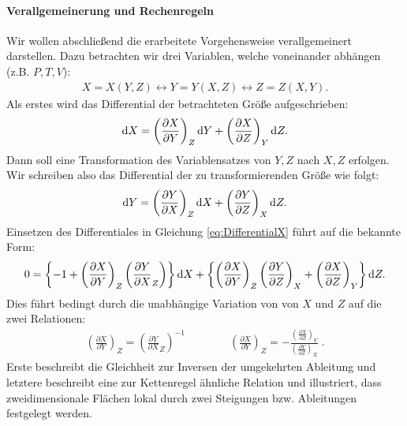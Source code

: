 \paragraph*{Verallgemeinerung und Rechenregeln}
Wir wollen abschließend die erarbeitete Vorgehensweise verallgemeinert darstellen. Dazu betrachten wir drei Variablen, welche voneinander abhängen (z.B. $P,T,V$):
\begin{align*}
	X=X(Y,Z) \leftrightarrow Y=Y(X,Z) \leftrightarrow Z=Z(X,Y).
\end{align*}
Als erstes wird das Differential der betrachteten Größe aufgeschrieben:
\begin{align}
	\label{eq:DifferentialX}
	\mathop{}\!\mathrm{d} X = \left(\frac{\partial X}{\partial Y}\right)_Z\mathop{}\!\mathrm{d} Y+\left(\frac{\partial X}{\partial Z}\right)_Y\mathop{}\!\mathrm{d} Z.
\end{align}
Dann soll eine Transformation des Variablensatzes von $Y,Z$ nach $X,Z$ erfolgen. Wir schreiben also das Differential der zu transformierenden Größe wie folgt:
\begin{align*}
	\mathop{}\!\mathrm{d} Y=\left(\frac{\partial Y}{\partial X}\right)_Z\mathop{}\!\mathrm{d} X+\left(\frac{\partial Y}{\partial Z}\right)_X\mathop{}\!\mathrm{d} Z.
\end{align*}
Einsetzen des Differentiales in Gleichung \ref{eq:DifferentialX} führt auf die bekannte Form:
\begin{align*}
	0=\left\{-1+\left(\frac{\partial X}{\partial Y}\right)_Z\left(\frac{\partial Y}{\partial X}_Z\right)\right\}\mathop{}\!\mathrm{d} X+\left\{\left(\frac{\partial X}{\partial Y}\right)_Z\left(\frac{\partial Y}{\partial Z}\right)_X+\left(\frac{\partial X}{\partial Z}\right)_Y\right\}\mathop{}\!\mathrm{d} Z.
\end{align*} 
Dies führt bedingt durch die unabhängige Variation von von $X$ und $Z$ auf die zwei Relationen:
\begin{align*}
	\boxed{\left(\frac{\partial X}{\partial Y}\right)_Z=\left(\frac{\partial Y}{\partial X}_Z\right)^{-1}\qquad \qquad \left(\frac{\partial X}{\partial Y}\right)_Z=-\frac{\left(\frac{\partial X}{\partial Z}\right)_Y}{\left(\frac{\partial Y}{\partial Z}\right)_X}}\;.
\end{align*}
Erste beschreibt die Gleichheit zur Inversen der umgekehrten Ableitung und letztere beschreibt eine zur Kettenregel ähnliche Relation und illustriert, dass zweidimensionale Flächen lokal durch zwei Steigungen bzw. Ableitungen festgelegt werden.

